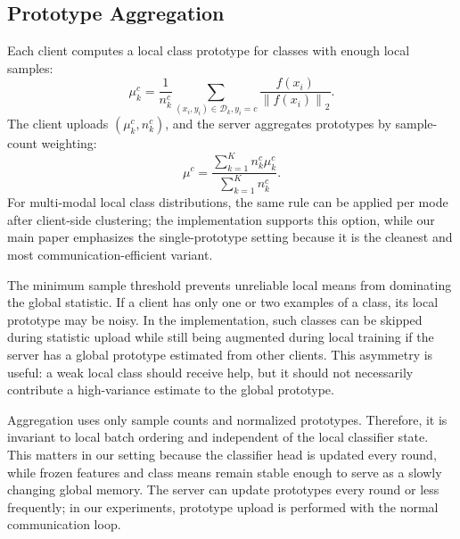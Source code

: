 ﻿\documentclass[conference]{IEEEtran}
\newcommand{\norm}[1]{\left\lVert #1 \right\rVert}
\begin{document}
\subsection{Prototype Aggregation}
Each client computes a local class prototype for classes with enough local samples:
\begin{equation}
\mu_k^c = \frac{1}{n_k^c}\sum_{(x_i,y_i)\in\mathcal{D}_k, y_i=c} \frac{f(x_i)}{\norm{f(x_i)}_2}.
\end{equation}
The client uploads $(\mu_k^c,n_k^c)$, and the server aggregates prototypes by sample-count weighting:
\begin{equation}
\mu^c = \frac{\sum_{k=1}^{K} n_k^c \mu_k^c}{\sum_{k=1}^{K} n_k^c}.
\end{equation}
For multi-modal local class distributions, the same rule can be applied per mode after client-side clustering; the implementation supports this option, while our main paper emphasizes the single-prototype setting because it is the cleanest and most communication-efficient variant.

The minimum sample threshold prevents unreliable local means from dominating the global statistic. If a client has only one or two examples of a class, its local prototype may be noisy. In the implementation, such classes can be skipped during statistic upload while still being augmented during local training if the server has a global prototype estimated from other clients. This asymmetry is useful: a weak local class should receive help, but it should not necessarily contribute a high-variance estimate to the global prototype.

Aggregation uses only sample counts and normalized prototypes. Therefore, it is invariant to local batch ordering and independent of the local classifier state. This matters in our setting because the classifier head is updated every round, while frozen features and class means remain stable enough to serve as a slowly changing global memory. The server can update prototypes every round or less frequently; in our experiments, prototype upload is performed with the normal communication loop.
\end{document}
